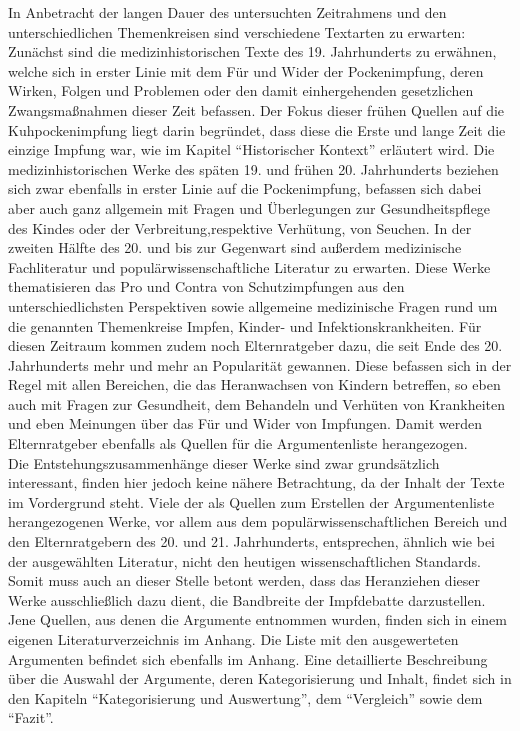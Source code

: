 \documentclass[
    a4paper,
    12pt,
    hyphens,
    chapterprefix=true,
    headheight=33pt,
    footheight=29pt,
    headings=optiontohead, %
]{scrartcl}
\begin{document}
In Anbetracht der langen Dauer des untersuchten Zeitrahmens und den unterschiedlichen Themenkreisen sind verschiedene Textarten zu erwarten: Zunächst sind die medizinhistorischen Texte des 19. Jahrhunderts zu erwähnen, welche sich in erster Linie mit dem Für und Wider der Pockenimpfung, deren Wirken, Folgen und Problemen oder den damit einhergehenden gesetzlichen Zwangsmaßnahmen dieser Zeit befassen. Der Fokus dieser frühen Quellen auf die Kuhpockenimpfung liegt darin begründet, dass diese die Erste und lange Zeit die einzige Impfung war, wie im Kapitel "`Historischer Kontext"' erläutert wird. Die medizinhistorischen Werke des späten 19. und frühen 20. Jahrhunderts beziehen sich zwar ebenfalls in erster Linie auf die Pockenimpfung, befassen sich dabei aber auch ganz allgemein mit Fragen und Überlegungen zur Gesundheitspflege des Kindes oder der Verbreitung,respektive Verhütung, von Seuchen. In der zweiten Hälfte des 20. und bis zur Gegenwart sind außerdem medizinische Fachliteratur und populärwissenschaftliche Literatur zu erwarten. Diese Werke thematisieren das Pro und Contra von Schutzimpfungen aus den unterschiedlichsten Perspektiven sowie allgemeine medizinische Fragen rund um die genannten Themenkreise Impfen, Kinder- und Infektionskrankheiten. Für diesen Zeitraum kommen zudem noch Elternratgeber dazu, die seit Ende des 20. Jahrhunderts mehr und mehr an Popularität gewannen. Diese befassen sich in der Regel mit allen Bereichen, die das Heranwachsen von Kindern betreffen, so eben auch mit Fragen zur Gesundheit, dem Behandeln und Verhüten von Krankheiten und eben Meinungen über das Für und Wider von Impfungen. Damit werden Elternratgeber ebenfalls als Quellen für die Argumentenliste herangezogen.\\
Die Entstehungszusammenhänge dieser Werke sind zwar grundsätzlich interessant, finden hier jedoch keine nähere Betrachtung, da der Inhalt der Texte im Vordergrund steht. Viele der als Quellen zum Erstellen der Argumentenliste herangezogenen Werke, vor allem aus dem populärwissenschaftlichen Bereich und den Elternratgebern des 20. und 21. Jahrhunderts, entsprechen, ähnlich wie bei der ausgewählten Literatur, nicht den heutigen wissenschaftlichen Standards. Somit muss auch an dieser Stelle betont werden, dass das Heranziehen dieser Werke ausschließlich dazu dient, die Bandbreite der Impfdebatte darzustellen.\\
Jene Quellen, aus denen die Argumente entnommen wurden, finden sich in einem eigenen Literaturverzeichnis im Anhang. Die Liste mit den ausgewerteten Argumenten befindet sich ebenfalls im Anhang. Eine detaillierte Beschreibung über die Auswahl der Argumente, deren Kategorisierung und Inhalt, findet sich in den Kapiteln "`Kategorisierung und Auswertung"', dem "`Vergleich"' sowie dem "`Fazit"'.
\end{document}
